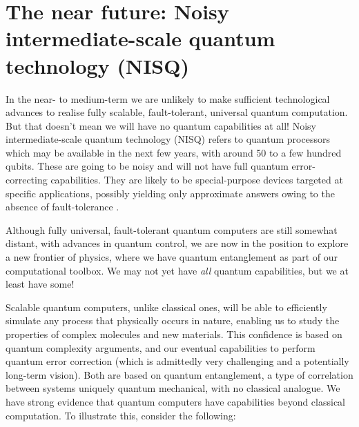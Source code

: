 \section{The near future: Noisy intermediate-scale quantum technology (NISQ)}\label{sec:NISQ}

In the near- to medium-term we are unlikely to make sufficient technological advances to realise fully scalable, fault-tolerant, universal quantum computation. But that doesn't mean we will have no quantum capabilities at all! Noisy intermediate-scale quantum technology (NISQ) refers to quantum processors which may be available in the next few years, with around 50 to a few hundred qubits. These are going to be noisy and will not have full quantum error-correcting capabilities. They are likely to be special-purpose devices targeted at specific applications, possibly yielding only approximate answers owing to the absence of fault-tolerance \cite{bib:preskill2018quantum}.

Although fully universal, fault-tolerant quantum computers are still somewhat distant, with advances in quantum control, we are now in the position to explore a new frontier of physics, where we have quantum entanglement as part of our computational toolbox. We may not yet have \textit{all} quantum capabilities, but we at least have some!

Scalable quantum computers, unlike classical ones, will be able to efficiently simulate any process that physically occurs in nature, enabling us to study the properties of complex molecules and new materials. This confidence is based on quantum complexity arguments, and our eventual capabilities to perform quantum error correction (which is admittedly very challenging and a potentially long-term vision). Both are based on quantum entanglement, a type of correlation between systems uniquely quantum mechanical, with no classical analogue. We have strong evidence that quantum computers have capabilities beyond classical computation. To illustrate this, consider the following:

